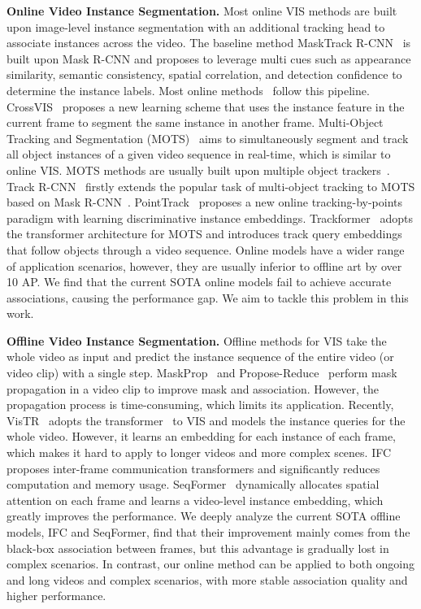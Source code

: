 \documentclass[runningheads]{llncs}
\begin{document}
\noindent\textbf{Online Video Instance Segmentation.}
Most online VIS methods are built upon image-level instance segmentation with an additional tracking head to associate instances across the video. The baseline method MaskTrack R-CNN~\cite{MaskTrackRCNN} is built upon Mask R-CNN and proposes to leverage multi cues such as appearance similarity, semantic consistency, spatial correlation, and detection confidence to determine the instance labels. 
Most online methods~\cite{sipmask,compfeat,STMask,CrossVIS,STC} follow this pipeline. 
CrossVIS~\cite{CrossVIS} proposes a new learning scheme that uses the instance feature in the current frame to segment the same instance in another frame. Multi-Object Tracking and Segmentation (MOTS)~\cite{motchallenge,MOTS} aims to simultaneously segment and track all object instances of a given video sequence in real-time, which is similar to online VIS. MOTS methods are usually built upon multiple object trackers~\cite{Tracktor,QDTrack,FairMOT,CenterTrack,TransTrack,bytetrack,unicorn,PCAN}. Track R-CNN~\cite{MOTS} firstly extends the popular task of multi-object tracking to MOTS based on Mask R-CNN~\cite{MaskRCNN}. PointTrack~\cite{PointTrackV2} proposes a new online tracking-by-points paradigm with learning discriminative instance embeddings. Trackformer~\cite{Trackformer} adopts the transformer architecture for MOTS and introduces track query embeddings that follow objects through a video sequence.
Online models have a wider range of application scenarios, however, they are usually inferior to offline art by over 10 AP. We find that the current SOTA online models fail to achieve accurate associations,
causing the performance gap. We aim to tackle this problem in this work.





\noindent\textbf{Offline Video Instance Segmentation.}
Offline methods for VIS take the whole video as input and predict the instance sequence of the entire video (or video clip) with a single step. 
MaskProp~\cite{MaskProp} and Propose-Reduce~\cite{ProposeReduce} perform mask propagation in a video clip to improve mask and association. However, the propagation process is time-consuming, which limits its application.
Recently, VisTR~\cite{VisTR} adopts the transformer~\cite{transformers} to VIS and models the instance queries for the whole video. However, it learns an embedding for each instance of each frame, which makes it hard to apply to longer videos and more complex scenes.
IFC~\cite{IFC} proposes inter-frame communication transformers and significantly reduces computation and memory usage.
SeqFormer~\cite{seqformer} dynamically allocates spatial attention on each frame and learns a video-level instance embedding, which greatly improves the performance.
We deeply analyze the current SOTA offline models, IFC and SeqFormer, find that their improvement mainly comes from the black-box association between frames, 
but this advantage is gradually lost in complex scenarios.
{In contrast, our online method can be applied to both ongoing and long videos and complex scenarios, with more stable association quality and higher performance.}
\end{document}
